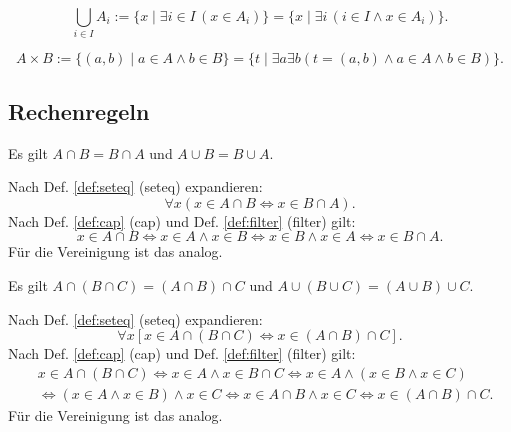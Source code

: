 \begin{Definition}\label{def:union}
\[\bigcup_{i\in I} A_i := \{x\mid \exists i{\in}I\,(x\in A_i)\}
= \{x\mid \exists i\,(i\in I\land x\in A_i)\}.\]
\end{Definition}

\begin{Definition}%
\label{def:cart}
\[A\times B := \{(a,b)\mid a\in A\land b\in B\}
= \{t\mid\exists a\exists b(t=(a,b)\land a\in A\land b\in B)\}.\]
\end{Definition}

\subsection{Rechenregeln}

\begin{Satz}[Kommutativgesetze]
Es gilt $A\cap B = B\cap A$ und $A\cup B = B\cup A$.
\end{Satz}

\begin{Beweis}
Nach Def. \ref{def:seteq} (seteq) expandieren:
\[\forall x(x\in A\cap B \iff x\in B\cap A).\]
Nach Def. \ref{def:cap} (cap) und Def. \ref{def:filter} (filter) gilt:
\[x\in A\cap B \iff x\in A\land x\in B \iff x\in B\land x\in A
\iff x\in B\cap A.\]
Für die Vereinigung ist das analog.\,\qedsymbol
\end{Beweis}

\begin{Satz}[Assoziativgesetze]%
Es gilt $A\cap (B\cap C) = (A\cap B)\cap C$
und $A\cup (B\cup C) = (A\cup B)\cup C$.
\end{Satz}

\begin{Beweis}
Nach Def. \ref{def:seteq} (seteq) expandieren:
\[\forall x[x\in A\cap (B\cap C) \iff x\in (A\cap B)\cap C].\]
Nach Def. \ref{def:cap} (cap) und Def. \ref{def:filter} (filter) gilt:
\begin{align*}
&x\in A\cap (B\cap C) \iff x\in A\land x\in B\cap C
\iff x\in A\land (x\in B\land x\in C)\\
&\iff (x\in A\land x\in B)\land x\in C
\iff x\in A\cap B\land x\in C
\iff x\in (A\cap B)\cap C.
\end{align*}
Für die Vereinigung ist das analog.\,\qedsymbol
\end{Beweis}

